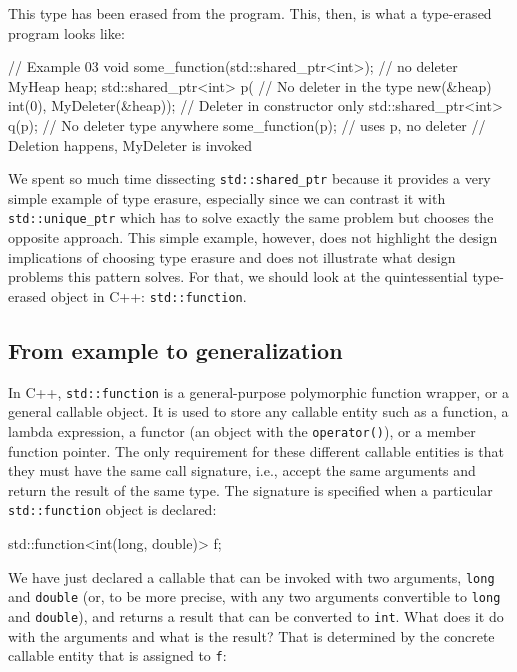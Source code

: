 This type has been erased from the program. This, then, is what a type-erased program looks like:

\begin{code}
// Example 03
void some_function(std::shared_ptr<int>);     // no deleter
MyHeap heap;
{
  std::shared_ptr<int> p(    // No deleter in the type
    new(&heap) int(0),
    MyDeleter(&heap));    // Deleter in constructor only
  std::shared_ptr<int> q(p);    // No deleter type anywhere
  some_function(p);    // uses p, no deleter
}    // Deletion happens, MyDeleter is invoked
\end{code}

We spent so much time dissecting \texttt{std::shared\_ptr} because it provides a very simple example of type erasure, especially since we can contrast it with \texttt{std::unique\_ptr} which has to solve exactly the same problem but chooses the opposite approach. This simple example, however, does not highlight the design implications of choosing type erasure and does not illustrate what design problems this pattern solves. For that, we should look at the quintessential type-erased object in C++: \texttt{std::function}.

\subsection{From example to generalization}

In C++, \texttt{std::function} is a general-purpose polymorphic function wrapper, or a general callable object. It is used to store any callable entity such as a function, a lambda expression, a functor (an object with the \texttt{operator()}), or a member function pointer. The only requirement for these different callable entities is that they must have the same call signature, i.e., accept the same arguments and return the result of the same type. The signature is specified when a particular \texttt{std::function} object is declared:

\begin{code}
std::function<int(long, double)> f;
\end{code}

We have just declared a callable that can be invoked with two arguments, \texttt{long} and \texttt{double} (or, to be more precise, with any two arguments convertible to \texttt{long} and \texttt{double}), and returns a result that can be converted to \texttt{int}. What does it do with the arguments and what is the result? That is determined by the concrete callable entity that is assigned to \texttt{f}:

